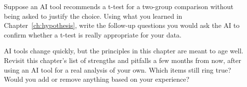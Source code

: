 \begin{exercise}
Suppose an AI tool recommends a t-test for a two-group comparison
  without being asked to justify the choice. Using what you learned in
  Chapter~\ref{ch:hypothesis}, write the follow-up questions you would
  ask the AI to confirm whether a t-test is really appropriate for
  your data.
\end{exercise}

\begin{exercise}
AI tools change quickly, but the principles in this chapter are meant
  to age well. Revisit this chapter's list of strengths and pitfalls a
  few months from now, after using an AI tool for a real analysis of
  your own. Which items still ring true? Would you add or remove
  anything based on your experience?
\end{exercise}



